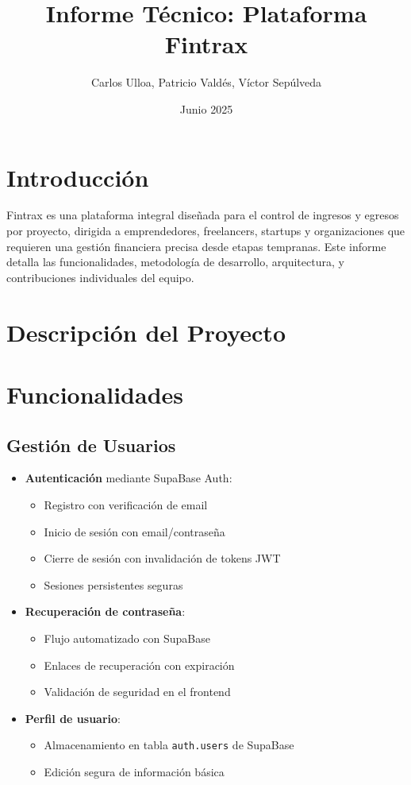 \documentclass[12pt, a4paper]{article}
\title{Informe Técnico: Plataforma Fintrax}
\author{Carlos Ulloa, Patricio Valdés, Víctor Sepúlveda}
\date{Junio 2025}
\begin{document}
\maketitle
\newpage
\section{Introducción}
Fintrax es una plataforma integral diseñada para el control de ingresos y egresos por proyecto, dirigida a emprendedores, freelancers, startups y organizaciones que requieren una gestión financiera precisa desde etapas tempranas. Este informe detalla las funcionalidades, metodología de desarrollo, arquitectura, y contribuciones individuales del equipo.
\newpage
\section{Descripción del Proyecto}

\section{Funcionalidades}
\subsection{Gestión de Usuarios}
\begin{itemize}
    \item \textbf{Autenticación} mediante SupaBase Auth:
    \begin{itemize}
        \item Registro con verificación de email
        \item Inicio de sesión con email/contraseña
        \item Cierre de sesión con invalidación de tokens JWT
        \item Sesiones persistentes seguras
    \end{itemize}
    
    \item \textbf{Recuperación de contraseña}:
    \begin{itemize}
        \item Flujo automatizado con SupaBase
        \item Enlaces de recuperación con expiración
        \item Validación de seguridad en el frontend
    \end{itemize}
    
    \item \textbf{Perfil de usuario}:
    \begin{itemize}
        \item Almacenamiento en tabla \texttt{auth.users} de SupaBase
        \item Edición segura de información básica
    \end{itemize}
\end{itemize}
\end{document}
